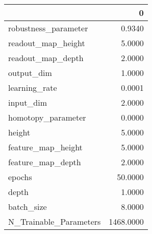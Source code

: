 \begin{tabular}{lr}
\toprule
{} &          0 \\
\midrule
robustness\_parameter   &     0.9340 \\
readout\_map\_height     &     5.0000 \\
readout\_map\_depth      &     2.0000 \\
output\_dim             &     1.0000 \\
learning\_rate          &     0.0001 \\
input\_dim              &     2.0000 \\
homotopy\_parameter     &     0.0000 \\
height                 &     5.0000 \\
feature\_map\_height     &     5.0000 \\
feature\_map\_depth      &     2.0000 \\
epochs                 &    50.0000 \\
depth                  &     1.0000 \\
batch\_size             &     8.0000 \\
N\_Trainable\_Parameters &  1468.0000 \\
\bottomrule
\end{tabular}
